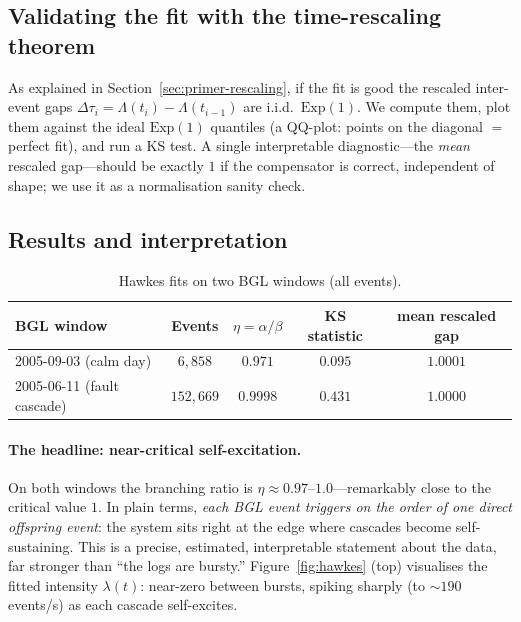 \documentclass[11pt,a4paper]{article}
\begin{document}
\subsection{Validating the fit with the time-rescaling theorem}
As explained in Section~\ref{sec:primer-rescaling}, if the fit is good the
rescaled inter-event gaps $\Delta\tau_i=\Lambda(t_i)-\Lambda(t_{i-1})$ are i.i.d.\
$\mathrm{Exp}(1)$. We compute them, plot them against the ideal $\mathrm{Exp}(1)$
quantiles (a QQ-plot: points on the diagonal $=$ perfect fit), and run a KS test.
A single interpretable diagnostic---the \emph{mean} rescaled gap---should be
exactly $1$ if the compensator is correct, independent of shape; we use it as a
normalisation sanity check.

\subsection{Results and interpretation}
\begin{table}[H]
\centering
\caption{Hawkes fits on two BGL windows (all events).}
\label{tab:hawkes}
\small
\renewcommand{\arraystretch}{1.15}
\begin{tabular}{@{}l c c c c@{}}
\toprule
BGL window & Events & \textbf{$\eta=\alpha/\beta$} & KS statistic & mean rescaled gap \\
\midrule
2005-09-03 (calm day) & $6{,}858$ & $\mathbf{0.971}$ & $0.095$ & $1.0001$ \\
2005-06-11 (fault cascade) & $152{,}669$ & $\mathbf{0.9998}$ & $0.431$ & $1.0000$ \\
\bottomrule
\end{tabular}
\end{table}

\paragraph{The headline: near-critical self-excitation.} On both windows the
branching ratio is $\eta\approx0.97$--$1.0$---remarkably close to the critical
value $1$. In plain terms, \emph{each BGL event triggers on the order of one
direct offspring event}: the system sits right at the edge where cascades become
self-sustaining. This is a precise, estimated, interpretable statement about the
data, far stronger than ``the logs are bursty.'' Figure~\ref{fig:hawkes} (top)
visualises the fitted intensity $\lambda(t)$: near-zero between bursts, spiking
sharply (to $\sim$$190$ events/s) as each cascade self-excites.
\end{document}

